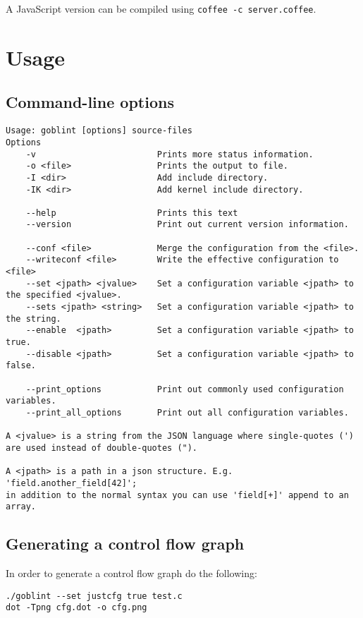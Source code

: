 A JavaScript version can be compiled using \verb|coffee -c server.coffee|.


\chapter{Usage}
\label{chap:app:usage}
\section{Command-line options}
\begin{lstlisting}
Usage: goblint [options] source-files
Options
    -v                        Prints more status information.                 
    -o <file>                 Prints the output to file.                      
    -I <dir>                  Add include directory.                          
    -IK <dir>                 Add kernel include directory.                   

    --help                    Prints this text                                
    --version                 Print out current version information.          

    --conf <file>             Merge the configuration from the <file>.        
    --writeconf <file>        Write the effective configuration to <file>     
    --set <jpath> <jvalue>    Set a configuration variable <jpath> to the specified <jvalue>.
    --sets <jpath> <string>   Set a configuration variable <jpath> to the string.
    --enable  <jpath>         Set a configuration variable <jpath> to true.   
    --disable <jpath>         Set a configuration variable <jpath> to false.  

    --print_options           Print out commonly used configuration variables.
    --print_all_options       Print out all configuration variables.          

A <jvalue> is a string from the JSON language where single-quotes (') are used instead of double-quotes (").

A <jpath> is a path in a json structure. E.g. 'field.another_field[42]';
in addition to the normal syntax you can use 'field[+]' append to an array.
\end{lstlisting}


\section{Generating a control flow graph}
In order to generate a control flow graph do the following:
\begin{lstlisting}
./goblint --set justcfg true test.c
dot -Tpng cfg.dot -o cfg.png 
\end{lstlisting}



